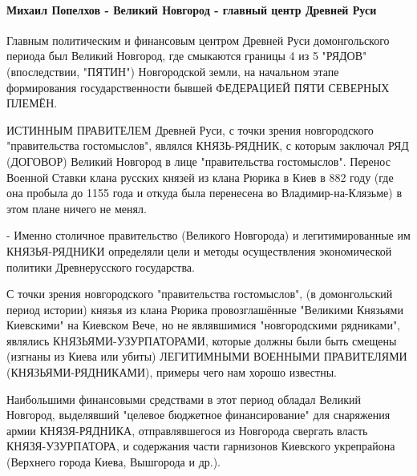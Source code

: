  
 
 
 
 
\paragraph{Михаил Попелхов - Великий Новгород - главный центр Древней Руси}

\begin{itemize}
 

Главным политическим и финансовым центром Древней Руси домонгольского периода
был Великий Новгород, где смыкаются границы 4 из 5 "РЯДОВ" (впоследствии,
"ПЯТИН") Новгородской земли, на начальном этапе формирования государственности
бывшей ФЕДЕРАЦИЕЙ ПЯТИ СЕВЕРНЫХ ПЛЕМЁН. 

ИСТИННЫМ ПРАВИТЕЛЕМ Древней Руси, с точки зрения новгородского "правительства
гостомыслов", являлся КНЯЗЬ-РЯДНИК, с которым заключал РЯД (ДОГОВОР) Великий
Новгород в лице "правительства гостомыслов". Перенос Военной Ставки клана
русских князей из клана Рюрика в Киев в 882 году (где она пробыла до 1155 года
и откуда была перенесена во Владимир-на-Клязьме) в этом плане ничего не менял. 

- Именно столичное правительство (Великого Новгорода) и легитимированные им
КНЯЗЬЯ-РЯДНИКИ определяли цели и методы осуществления экономической политики
Древнерусского государства. 

С точки зрения новгородского "правительства гостомыслов", (в
домонгольский период истории) князья из клана Рюрика провозглашённые "Великими
Князьями Киевскими" на Киевском Вече, но не являвшимися "новгородскими
рядниками", являлись КНЯЗЬЯМИ-УЗУРПАТОРАМИ, которые должны были быть смещены
(изгнаны из Киева или убиты) ЛЕГИТИМНЫМИ ВОЕННЫМИ ПРАВИТЕЛЯМИ
(КНЯЗЬЯМИ-РЯДНИКАМИ), примеры чего нам хорошо известны. 

Наибольшими финансовыми
средствами в этот период обладал Великий Новгород, выделявший "целевое
бюджетное финансирование" для снаряжения армии КНЯЗЯ-РЯДНИКА, отправлявшегося
из Новгорода свергать власть КНЯЗЯ-УЗУРПАТОРА, и содержания части гарнизонов
Киевского укрепрайона (Верхнего города Киева, Вышгорода и др.). 


\end{itemize}
